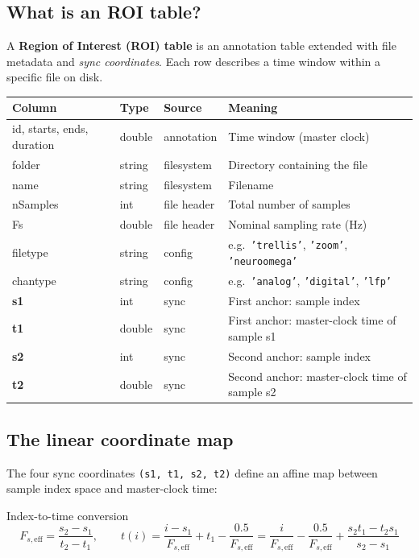 \documentclass[11pt, a4paper]{article}
\begin{document}
\subsection{What is an ROI table?}

A \textbf{Region of Interest (ROI) table} is an annotation table extended with file metadata and \emph{sync coordinates}. Each row describes a time window within a specific file on disk.

\begin{center}
\small
\begin{tabular}{llll}
\toprule
\textbf{Column} & \textbf{Type} & \textbf{Source} & \textbf{Meaning} \\
\midrule
id, starts, ends, duration & double & annotation & Time window (master clock) \\
folder & string & filesystem & Directory containing the file \\
name & string & filesystem & Filename \\
nSamples & int & file header & Total number of samples \\
Fs & double & file header & Nominal sampling rate (Hz) \\
filetype & string & config & e.g.\ \texttt{'trellis'}, \texttt{'zoom'}, \texttt{'neuroomega'} \\
chantype & string & config & e.g.\ \texttt{'analog'}, \texttt{'digital'}, \texttt{'lfp'} \\
\midrule
\textbf{s1} & int & sync & First anchor: sample index \\
\textbf{t1} & double & sync & First anchor: master-clock time of sample s1 \\
\textbf{s2} & int & sync & Second anchor: sample index \\
\textbf{t2} & double & sync & Second anchor: master-clock time of sample s2 \\
\bottomrule
\end{tabular}
\end{center}

\subsection{The linear coordinate map}

The four sync coordinates \texttt{(s1, t1, s2, t2)} define an affine map between sample index space and master-clock time:

\begin{formulabox}{Index-to-time conversion}
\[
F_{s,\mathrm{eff}} = \frac{s_2 - s_1}{t_2 - t_1}, \qquad
t(i) = \frac{i - s_1}{F_{s,\mathrm{eff}}} + t_1 - \frac{0.5}{F_{s,\mathrm{eff}}}
     = \frac{i}{F_{s,\mathrm{eff}}} - \frac{0.5}{F_{s,\mathrm{eff}}} + \frac{s_2 t_1 - t_2 s_1}{s_2 - s_1}
\]
\end{formulabox}
\end{document}
